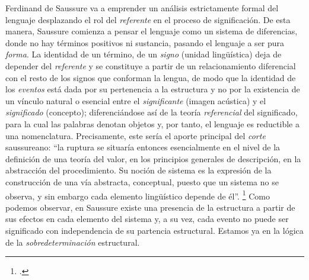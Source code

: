 Ferdinand de Saussure va a emprender un análisis estrictamente formal del lenguaje desplazando  el rol del \emph{referente} en el proceso de significación. De esta manera, Saussure comienza a pensar el lenguaje como un sistema de diferencias, donde no hay términos positivos ni sustancia, pasando el lenguaje a ser pura \emph{forma}. La identidad de un término, de un \emph{signo} (unidad lingüística) deja de depender del \emph{referente} y se constituye a partir de un relacionamiento diferencial con el resto de los signos que conforman la lengua, de modo que la identidad de los \emph{eventos} está dada por su pertenencia a la estructura y no por la existencia de un vínculo natural o esencial entre el \emph{significante} (imagen acústica) y el \emph{significado} (concepto); diferenciándose así de la teoría \emph{referencial} del significado, para la cual las palabras denotan objetos y, por tanto, el lenguaje es reductible a una nomenclatura. Precisamente, este sería el aporte principal del \emph{corte} saussureano: \enquote{la ruptura se situaría entonces esencialmente en el nivel de la definición de una teoría del valor, en los principios generales de descripción, en la abstracción del procedimiento. Su noción de sistema es la expresión de la construcción de una vía abstracta, conceptual, puesto que un sistema no se observa, y sin embargo cada elemento lingüístico depende de él}. \footcite[][64]{@6995-DOSSE2004} Como podemos observar, en Saussure existe una presencia de la estructura a partir de sus efectos en cada elemento del sistema y, a su vez, cada evento no puede ser significado con independencia de su partencia estructural. Estamos ya  en la lógica de la \emph{sobredeterminación} estructural.

